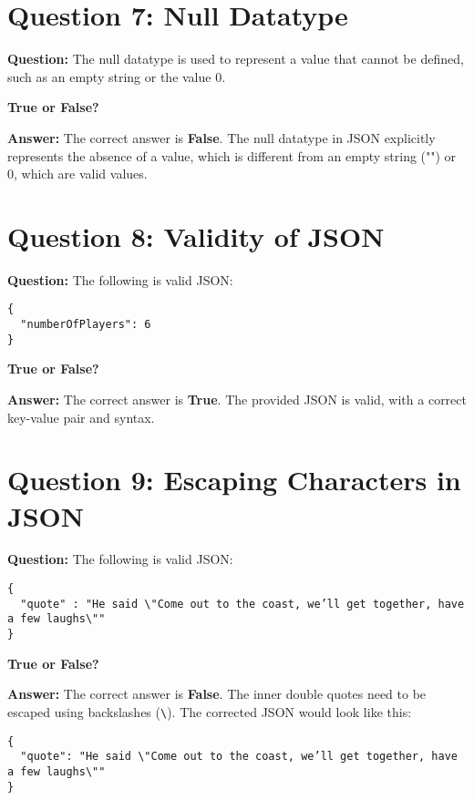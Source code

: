 \documentclass{article}
\begin{document}
\section*{Question 7: Null Datatype}

\textbf{Question:} The null datatype is used to represent a value that cannot be defined, such as an empty string or the value 0.

\textbf{True or False?}

\textbf{Answer:} The correct answer is \textbf{False}. The null datatype in JSON explicitly represents the absence of a value, which is different from an empty string ("") or 0, which are valid values.

\section*{Question 8: Validity of JSON}

\textbf{Question:} The following is valid JSON:

\begin{lstlisting}
{
  "numberOfPlayers": 6
}
\end{lstlisting}

\textbf{True or False?}

\textbf{Answer:} The correct answer is \textbf{True}. The provided JSON is valid, with a correct key-value pair and syntax.

\section*{Question 9: Escaping Characters in JSON}

\textbf{Question:} The following is valid JSON:

\begin{lstlisting}
{
  "quote" : "He said \"Come out to the coast, we’ll get together, have a few laughs\""
}
\end{lstlisting}

\textbf{True or False?}

\textbf{Answer:} The correct answer is \textbf{False}. The inner double quotes need to be escaped using backslashes (\texttt{\textbackslash}). The corrected JSON would look like this:

\begin{lstlisting}
{
  "quote": "He said \"Come out to the coast, we’ll get together, have a few laughs\""
}
\end{lstlisting}
\end{document}
